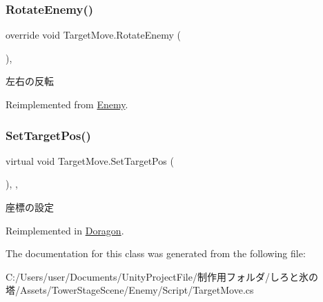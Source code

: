 \mbox{\label{class_target_move_afb69b9930791bef6aaa96b8d92ce27c2}} 
\subsubsection{\texorpdfstring{Rotate\+Enemy()}{RotateEnemy()}}
{\footnotesize\ttfamily override void Target\+Move.\+Rotate\+Enemy (\begin{DoxyParamCaption}{ }\end{DoxyParamCaption})\hspace{0.3cm}{\ttfamily [inline]}, {\ttfamily [virtual]}}



左右の反転 



Reimplemented from \hyperlink{class_enemy_a2a0e665070fd362bd3ab2f2962ebff93}{Enemy}.

\mbox{\label{class_target_move_a72a50d04fd830edcb8ae5d3b63c3cc36}} 
\subsubsection{\texorpdfstring{Set\+Target\+Pos()}{SetTargetPos()}}
{\footnotesize\ttfamily virtual void Target\+Move.\+Set\+Target\+Pos (\begin{DoxyParamCaption}{ }\end{DoxyParamCaption})\hspace{0.3cm}{\ttfamily [inline]}, {\ttfamily [protected]}, {\ttfamily [virtual]}}



座標の設定 



Reimplemented in \hyperlink{class_doragon_ada19292614ee1a706b373875fab11a01}{Doragon}.



The documentation for this class was generated from the following file\+:\begin{DoxyCompactItemize}
\item 
C\+:/\+Users/user/\+Documents/\+Unity\+Project\+File/制作用フォルダ/しろと氷の塔/\+Assets/\+Tower\+Stage\+Scene/\+Enemy/\+Script/Target\+Move.\+cs\end{DoxyCompactItemize}
